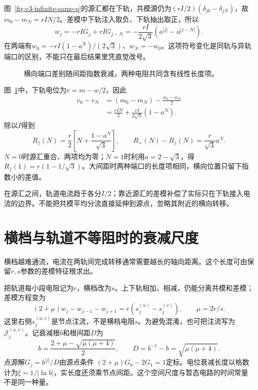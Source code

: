 \begin{solution}
图~\ref{fig:c3-infinite-same-q}的源汇都在下轨，共模源仍为$(rI/2)(\delta_{j0}-\delta_{jN})$，故$m_0-m_N=rIN/2$。差模中下轨注入取负、下轨抽出取正，所以
\[
 w_j=-rIG_j+rIG_{j-N}
 =-\frac{rI}{2\sqrt3}(a^{|j|}-a^{|j-N|}).
\]
在两端有$w_0=-rI(1-a^N)/(2\sqrt3)$、$w_N=-w_0$。这项符号变化是同轨与异轨端口的区别，不能只在最后结果里凭直觉改号。
\begin{figure}[H]\centering
{}
\caption{横向端口差别随间距指数衰减，两种电阻共同含有线性长度项。}\label{fig:c3-infinite-same-s}
\end{figure}
图~\ref{fig:c3-infinite-same-s}中，下轨电位为$v=m-w/2$，因此
\[
 \begin{aligned}
 v_0-v_N&=(m_0-m_N)-\frac{w_0-w_N}2\\
 &=\frac{rIN}2+\frac{rI}{2\sqrt3}(1-a^N).
 \end{aligned}
\]
除以$I$得到
\[
 \boxed{R_\parallel(N)=\frac r2\left[N+\frac{1-a^N}{\sqrt3}\right]},\qquad
 R_\times(N)-R_\parallel(N)=\frac r{\sqrt3}a^N.
\]
$N=0$时源汇重合、两项均为零；$N=1$时利用$a=2-\sqrt3$，得$R_\parallel(1)=r(1-1/\sqrt3)$。大间距时两种端口的长度项相同，横向位置只留下指数小的差值。

在源汇之间，轨道电流趋于各分$I/2$；靠近源汇的差模补偿了实际只在下轨接入电流的边界。不能把共模平均分流直接延伸到源点，忽略其附近的横向转移。
\end{solution}



\section{横档与轨道不等阻时的衰减尺度}
横档越难通流，电流在两轨间完成转移通常需要越长的轴向距离。这个长度可由保留$r,s$参数的差模特征根求出。

把轨道每小段电阻记为$r$，横档改为$s$。上下轨相加、相减，仍能分离共模和差模；差模方程变为
\[
 (2+\mu)w_j-w_{j-1}-w_{j+1}
 =r(s_j^{(u)}-s_j^{(v)}),\qquad \mu=2r/s.
\]
这里右侧$s_j^{(u,v)}$是节点注流，不是横档电阻$s$。为避免混淆，也可把注流写为$\mathcal J_j^{(u,v)}$。记衰减根$b$和根间距$D$为
\[
 b=\frac{2+\mu-\sqrt{\mu(\mu+4)}}2,\qquad
 D=b^{-1}-b=\sqrt{\mu(\mu+4)}.
\]
点源解$G_j=b^{|j|}/D$由源点条件
$(2+\mu)G_0-2G_1=1$定标。电位衰减长度以格数计为$\xi=1/|\ln b|$，实长度还须乘节点间距。这个空间尺度与暂态电路的时间常量不是同一种量。

